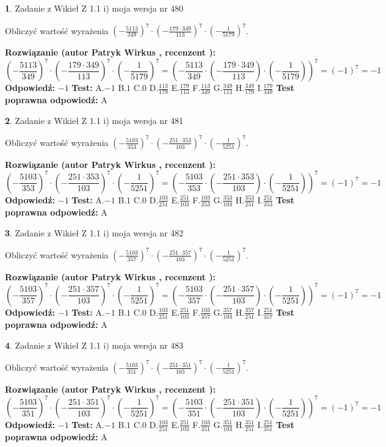 \documentclass[12pt, a4paper]{article}
\theoremstyle{definition} %
\newtheorem{zad}{}
\newcommand{\zadStart}[1]{\begin{zad}#1\newline}
\newcommand{\zadStop}{\end{zad}}
\newcommand{\rozwStart}[2]{\noindent \textbf{Rozwiązanie (autor #1 , recenzent #2): }\newline}
\newcommand{\rozwStop}{\newline}
\newcommand{\odpStart}{\noindent \textbf{Odpowiedź:}\newline}
\newcommand{\odpStop}{\newline}
\newcommand{\testStart}{\noindent \textbf{Test:}\newline}
\newcommand{\testStop}{\newline}
\newcommand{\kluczStart}{\noindent \textbf{Test poprawna odpowiedź:}\newline}
\newcommand{\kluczStop}{\newline}
\begin{document}
\zadStart{Zadanie z Wikieł Z 1.1 i) moja wersja nr 480}

Obliczyć wartość wyrażenia $(-\frac{5113}{349})^{7} \cdot (-\frac{179 \cdot 349}{113})^{7} \cdot (-\frac{1}{5179})^{7}$.
\zadStop
\rozwStart{Patryk Wirkus}{}
$$(-\frac{5113}{349})^{7} \cdot (-\frac{179 \cdot 349}{113})^{7} \cdot (-\frac{1}{5179})^{7} = (-\frac{5113}{349} \cdot (-\frac{179 \cdot 349}{113}) \cdot (-\frac{1}{5179}))^{7} = (-1)^{7} = -1$$
\rozwStop
\odpStart
$-1$
\odpStop
\testStart
A.$-1$ B.$1$ C.$0$ D.$\frac{113}{179}$ E.$\frac{179}{113}$
F.$\frac{113}{349}$ G.$\frac{349}{113}$
H.$\frac{349}{179}$
I.$\frac{179}{349}$
\testStop
\kluczStart
A
\kluczStop



\zadStart{Zadanie z Wikieł Z 1.1 i) moja wersja nr 481}

Obliczyć wartość wyrażenia $(-\frac{5103}{353})^{7} \cdot (-\frac{251 \cdot 353}{103})^{7} \cdot (-\frac{1}{5251})^{7}$.
\zadStop
\rozwStart{Patryk Wirkus}{}
$$(-\frac{5103}{353})^{7} \cdot (-\frac{251 \cdot 353}{103})^{7} \cdot (-\frac{1}{5251})^{7} = (-\frac{5103}{353} \cdot (-\frac{251 \cdot 353}{103}) \cdot (-\frac{1}{5251}))^{7} = (-1)^{7} = -1$$
\rozwStop
\odpStart
$-1$
\odpStop
\testStart
A.$-1$ B.$1$ C.$0$ D.$\frac{103}{251}$ E.$\frac{251}{103}$
F.$\frac{103}{353}$ G.$\frac{353}{103}$
H.$\frac{353}{251}$
I.$\frac{251}{353}$
\testStop
\kluczStart
A
\kluczStop



\zadStart{Zadanie z Wikieł Z 1.1 i) moja wersja nr 482}

Obliczyć wartość wyrażenia $(-\frac{5103}{357})^{7} \cdot (-\frac{251 \cdot 357}{103})^{7} \cdot (-\frac{1}{5251})^{7}$.
\zadStop
\rozwStart{Patryk Wirkus}{}
$$(-\frac{5103}{357})^{7} \cdot (-\frac{251 \cdot 357}{103})^{7} \cdot (-\frac{1}{5251})^{7} = (-\frac{5103}{357} \cdot (-\frac{251 \cdot 357}{103}) \cdot (-\frac{1}{5251}))^{7} = (-1)^{7} = -1$$
\rozwStop
\odpStart
$-1$
\odpStop
\testStart
A.$-1$ B.$1$ C.$0$ D.$\frac{103}{251}$ E.$\frac{251}{103}$
F.$\frac{103}{357}$ G.$\frac{357}{103}$
H.$\frac{357}{251}$
I.$\frac{251}{357}$
\testStop
\kluczStart
A
\kluczStop



\zadStart{Zadanie z Wikieł Z 1.1 i) moja wersja nr 483}

Obliczyć wartość wyrażenia $(-\frac{5103}{351})^{7} \cdot (-\frac{251 \cdot 351}{103})^{7} \cdot (-\frac{1}{5251})^{7}$.
\zadStop
\rozwStart{Patryk Wirkus}{}
$$(-\frac{5103}{351})^{7} \cdot (-\frac{251 \cdot 351}{103})^{7} \cdot (-\frac{1}{5251})^{7} = (-\frac{5103}{351} \cdot (-\frac{251 \cdot 351}{103}) \cdot (-\frac{1}{5251}))^{7} = (-1)^{7} = -1$$
\rozwStop
\odpStart
$-1$
\odpStop
\testStart
A.$-1$ B.$1$ C.$0$ D.$\frac{103}{251}$ E.$\frac{251}{103}$
F.$\frac{103}{351}$ G.$\frac{351}{103}$
H.$\frac{351}{251}$
I.$\frac{251}{351}$
\testStop
\kluczStart
A
\kluczStop
\end{document}
